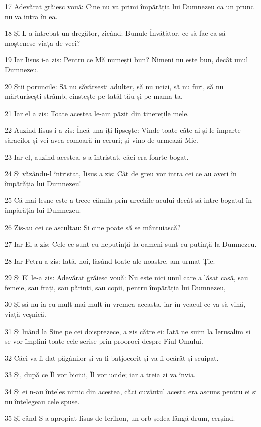 \par 17 Adevărat grăiesc vouă: Cine nu va primi împărăția lui Dumnezeu ca un prunc nu va intra în ea.
\par 18 Și L-a întrebat un dregător, zicând: Bunule Învățător, ce să fac ca să moștenesc viața de veci?
\par 19 Iar Iisus i-a zis: Pentru ce Mă numești bun? Nimeni nu este bun, decât unul Dumnezeu.
\par 20 Știi poruncile: Să nu săvârșești adulter, să nu ucizi, să nu furi, să nu mărturisești strâmb, cinstește pe tatăl tău și pe mama ta.
\par 21 Iar el a zis: Toate acestea le-am păzit din tinerețile mele.
\par 22 Auzind Iisus i-a zis: Încă una îți lipsește: Vinde toate câte ai și le împarte săracilor și vei avea comoară în ceruri; și vino de urmează Mie.
\par 23 Iar el, auzind acestea, s-a întristat, căci era foarte bogat.
\par 24 Și văzându-l întristat, Iisus a zis: Cât de greu vor intra cei ce au averi în împărăția lui Dumnezeu!
\par 25 Că mai lesne este a trece cămila prin urechile acului decât să intre bogatul în împărăția lui Dumnezeu.
\par 26 Zis-au cei ce ascultau: Și cine poate să se mântuiască?
\par 27 Iar El a zis: Cele ce sunt cu neputință la oameni sunt cu putință la Dumnezeu.
\par 28 Iar Petru a zis: Iată, noi, lăsând toate ale noastre, am urmat Ție.
\par 29 Și El le-a zis: Adevărat grăiesc vouă: Nu este nici unul care a lăsat casă, sau femeie, sau frați, sau părinți, sau copii, pentru împărăția lui Dumnezeu,
\par 30 Și să nu ia cu mult mai mult în vremea aceasta, iar în veacul ce va să vină, viață veșnică.
\par 31 Și luând la Sine pe cei doisprezece, a zis către ei: Iată ne suim la Ierusalim și se vor împlini toate cele scrise prin prooroci despre Fiul Omului.
\par 32 Căci va fi dat păgânilor și va fi batjocorit și va fi ocărât și scuipat.
\par 33 Și, după ce Îl vor biciui, Îl vor ucide; iar a treia zi va învia.
\par 34 Și ei n-au înțeles nimic din acestea, căci cuvântul acesta era ascuns pentru ei și nu înțelegeau cele spuse.
\par 35 Și când S-a apropiat Iisus de Ierihon, un orb ședea lângă drum, cerșind.
